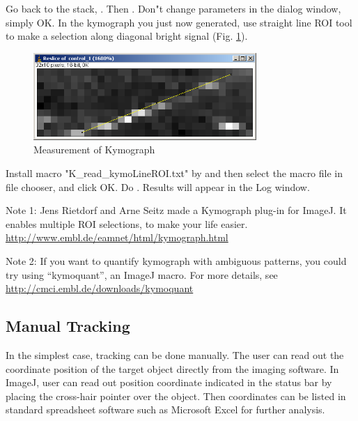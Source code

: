 \begin{indentexercise}{1}
Go back to the stack, . Then . Don"t change parameters in the dialog window, simply OK. In the kymograph you just now generated, use straight line ROI tool to make a selection along diagonal bright signal (Fig. \ref{fig:img134}). 

\begin{figure}[htbp]
\begin{center}
\includegraphics[width=8.467cm,height=3.307cm]{img/CMCIBasicCourse201102-img134.png}
\caption{ Measurement of Kymograph}
\label{fig:img134}
\end{center}
\end{figure}

Install macro "K\_read\_kymoLineROI.txt" by  and then select the macro file in file chooser, and click OK.
Do . Results will
appear in the Log window.

Note 1: Jens Rietdorf and Arne Seitz made a Kymograph plug-in for ImageJ. It
enables multiple ROI selections, to make your life easier. \\
\url{http://www.embl.de/eamnet/html/kymograph.html}

Note 2: If you want to quantify kymograph with ambiguous patterns, you could try
using ``kymoquant'', an ImageJ macro.
For more details, see
\url{http://cmci.embl.de/downloads/kymoquant}

\end{indentexercise}

\subsection{Manual Tracking}
\label{subsubsec:manualtracker}

In the simplest case, tracking can be done manually. The user can read
out the coordinate position of the target object directly from the
imaging software. In ImageJ, user can read out position coordinate
indicated in the status bar by placing the cross-hair pointer over the
object. Then coordinates can be listed in standard spreadsheet software
such as Microsoft Excel for further analysis. 

